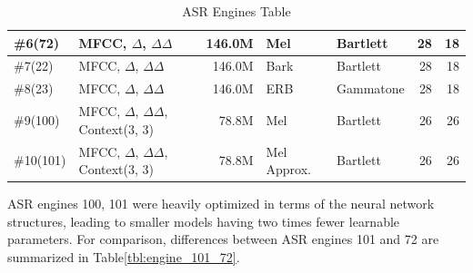 \begin{table}[H]
\begin{tabular}{ !{\color{ytblborder}\vrule}l!{\color{ytblborder}\vrule}lrllrr| }
    \hline
      \#6(72)  
        & MFCC, \(\Delta\), \(\Delta\Delta\) 
        & 146.0M
        & Mel 
        & Bartlett
        & 28 
        & 18 \\
    \hline

    \hline
      \#7(22)  
        & MFCC, \(\Delta\), \(\Delta\Delta\) 
        & 146.0M
        & Bark 
        & Bartlett
        & 28 
        & 18 \\
    \hline

    \hline
      \#8(23)  
        & MFCC, \(\Delta\), \(\Delta\Delta\) 
        & 146.0M
        & ERB
        & Gammatone
        & 28 
        & 18 \\
    \hline

    \hline
      \#9(100)  
        & MFCC, \(\Delta\), \(\Delta\Delta\), Context(3, 3)
        & 78.8M
        & Mel 
        & Bartlett
        & 26 
        & 26 \\
    \hline

    \hline
      \#10(101)
        & MFCC, \(\Delta\), \(\Delta\Delta\), Context(3, 3)
        & 78.8M
        & Mel Approx.
        & Bartlett
        & 26 
        & 26 \\
    \hline

    \hline
\end{tabular}
\caption{ASR Engines Table}
\label{tbl:asr_engines}
\end{table}
\vspace{-0.7cm}
ASR engines 100, 101 were heavily 
optimized in terms of the neural network structures, 
leading to smaller models having two times fewer learnable parameters.
For comparison, differences between ASR engines 101
and 72 are summarized in
Table\;\ref{tbl:engine_101_72}.
